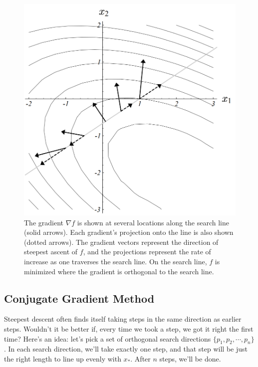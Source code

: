 \documentclass{article}
\begin{document}
\begin{figure}[H]
   \centering
   \includegraphics[scale=0.3]{search_line.png}
   \caption{The gradient $\nabla f$ is shown at several locations along the search line (solid arrows). Each gradient’s projection onto the line is also shown (dotted arrows). The gradient vectors represent the direction of steepest ascent of $f$, and the projections represent the rate of increase as one traverses the search line. On the search line, $f$ is minimized where the gradient is orthogonal to the search line.}
   \label{fig:searchline}
\end{figure}

\subsection{Conjugate Gradient Method}

Steepest descent often finds itself taking steps in the same direction as earlier steps.  Wouldn’t it be better if, every time we took a step, we got it right the first time? Here’s an idea: let’s pick a set of orthogonal search directions $\{ p_1,  p_2,\cdots, p_n\}$. In each search direction, we’ll take exactly one step, and that step will be just the right length to line up evenly with $x_*$. After $n$ steps, we’ll be done.
\end{document}
